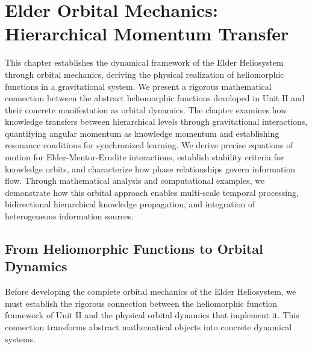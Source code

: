 \chapter{Elder Orbital Mechanics: Hierarchical Momentum Transfer}

\begin{chapterabstract}
This chapter establishes the dynamical framework of the Elder Heliosystem through orbital mechanics, deriving the physical realization of heliomorphic functions in a gravitational system. We present a rigorous mathematical connection between the abstract heliomorphic functions developed in Unit II and their concrete manifestation as orbital dynamics. The chapter examines how knowledge transfers between hierarchical levels through gravitational interactions, quantifying angular momentum as knowledge momentum and establishing resonance conditions for synchronized learning. We derive precise equations of motion for Elder-Mentor-Erudite interactions, establish stability criteria for knowledge orbits, and characterize how phase relationships govern information flow. Through mathematical analysis and computational examples, we demonstrate how this orbital approach enables multi-scale temporal processing, bidirectional hierarchical knowledge propagation, and integration of heterogeneous information sources.
\end{chapterabstract}

\section{From Heliomorphic Functions to Orbital Dynamics}

Before developing the complete orbital mechanics of the Elder Heliosystem, we must establish the rigorous connection between the heliomorphic function framework of Unit II and the physical orbital dynamics that implement it. This connection transforms abstract mathematical objects into concrete dynamical systems.

